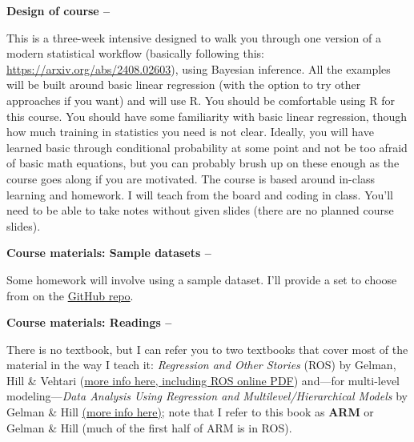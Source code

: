 \documentclass[11pt]{article}
\begin{document}


\begin{large}
{\raggedright \textbf{Design of course --}}
\end{large}
 This is a three-week intensive designed to walk you through one version of a modern statistical workflow (basically following this: \url{https://arxiv.org/abs/2408.02603}), using Bayesian inference. All the examples will be built around basic linear regression (with the option to try other approaches if you want) and will use R. You should be comfortable using R for this course.  You should have some familiarity with basic linear regression, though how much training in statistics you need is not clear. Ideally, you will have learned basic through conditional probability at some point and not be too afraid of basic math equations, but you can probably brush up on these enough as the course goes along if you are motivated. The course is based around in-class learning and homework. I will teach from the board and coding in class. You'll need to be able to take notes without given slides (there are no planned course slides). \\

\begin{large}
{\raggedright \textbf{Course materials: Sample datasets --}}
\end{large}
Some homework will involve using a sample dataset. I'll provide a set to choose from on the \href{https://github.com/temporalecologylab/bayes2025homework}{GitHub repo}.\\

\begin{large}
{\raggedright \textbf{Course materials: Readings --}}
\end{large}
There is no textbook, but I can refer you to two textbooks that cover most of the material in the way I teach it: \emph{Regression and Other Stories} (ROS) by Gelman, Hill \& Vehtari (\href{https://avehtari.github.io/ROS-Examples/}{more info here, including ROS online PDF}) and---for multi-level modeling---\emph{Data Analysis Using Regression and Multilevel/Hierarchical Models} by Gelman \& Hill \href{http://www.stat.columbia.edu/~gelman/arm/}{(more info here)}; note that I refer to this book as {\bf ARM} or Gelman \& Hill (much of the first half of ARM is in ROS). \\
\end{document}
